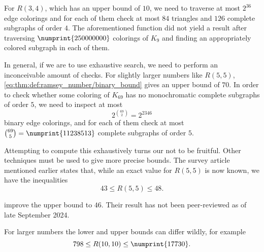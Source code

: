 \begin{remark}
  For \( R(3, 4) \), which has an upper bound of \( 10 \), we need to traverse at most \( 2^{36} \) edge colorings and for each of them check at most \( 84 \) triangles and \( 126 \) complete subgraphs of order \( 4 \). The aforementioned function did not yield a result after traversing \( \numprint{250 000 000} \) colorings of \( K_9 \) and finding an appropriately colored subgraph in each of them.

  In general, if we are to use exhaustive search, we need to perform an inconceivable amount of checks. For slightly larger numbers like \( R(5, 5) \), \eqref{eq:thm:def:ramsey_number/binary_bound} gives an upper bound of \( 70 \). In order to check whether some coloring of \( K_{69} \) has no monochromatic complete subgraphs of order \( 5 \), we need to inspect at most
  \begin{equation*}
    2^{\binom {69} 2} = 2^{2346}
  \end{equation*}
  binary edge colorings, and for each of them check at most \( \binom {69} 5 = \numprint{11 238 513} \) complete subgraphs of order \( 5 \).

  Attempting to compute this exhaustively turns our not to be fruitful. Other techniques must be used to give more precise bounds. The survey article \cite[4]{Radziszowski2021SmallRamseyNumbers} mentioned earlier states that, while an exact value for \( R(5, 5) \) is now known, we have the inequalities
  \begin{equation*}
    43 \leq R(5, 5) \leq 48.
  \end{equation*}

   improve the upper bound to \( 46 \). Their result has not been peer-reviewed as of late September 2024.

  For larger numbers the lower and upper bounds can differ wildly, for example
  \begin{equation*}
    798 \leq R(10, 10) \leq \numprint{17 730}.
  \end{equation*}
\end{remark}
